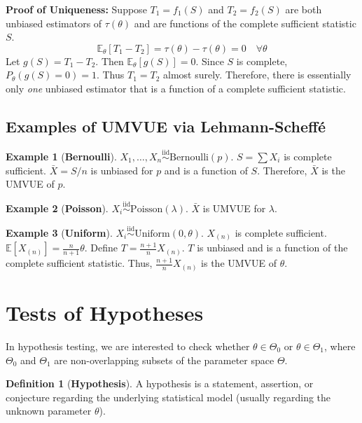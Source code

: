 \documentclass[12pt, a4paper]{article}
\theoremstyle{definition}
\newtheorem{definition}{Definition}
\newtheorem{example}{Example}
\newcommand{\E}{\mathbb{E}}
\newcommand{\iid}{\overset{\text{iid}}{\sim}}
\begin{document}
\textbf{Proof of Uniqueness:}
Suppose $T_1 = f_1(S)$ and $T_2 = f_2(S)$ are both unbiased estimators of $\tau(\theta)$ and are functions of the complete sufficient statistic $S$.
$$ \E_\theta[T_1 - T_2] = \tau(\theta) - \tau(\theta) = 0 \quad \forall \theta $$
Let $g(S) = T_1 - T_2$. Then $\E_\theta[g(S)] = 0$.
Since $S$ is complete, $P_\theta(g(S) = 0) = 1$.
Thus $T_1 = T_2$ almost surely.
Therefore, there is essentially only \textit{one} unbiased estimator that is a function of a complete sufficient statistic.

\subsection{Examples of UMVUE via Lehmann-Scheffé}

\begin{example}[\textbf{Bernoulli}]
$X_1, \dots, X_n \iid \text{Bernoulli}(p)$.
$S = \sum X_i$ is complete sufficient.
$\bar{X} = S/n$ is unbiased for $p$ and is a function of $S$.
Therefore, $\bar{X}$ is the UMVUE of $p$.
\end{example}

\begin{example}[\textbf{Poisson}]
$X_i \iid \text{Poisson}(\lambda)$. $\bar{X}$ is UMVUE for $\lambda$.
\end{example}

\begin{example}[\textbf{Uniform}]
$X_i \iid \text{Uniform}(0, \theta)$.
$X_{(n)}$ is complete sufficient.
$\E[X_{(n)}] = \frac{n}{n+1}\theta$.
Define $T = \frac{n+1}{n} X_{(n)}$.
$T$ is unbiased and is a function of the complete sufficient statistic.
Thus, $\frac{n+1}{n} X_{(n)}$ is the UMVUE of $\theta$.
\end{example}

\section{Tests of Hypotheses}

In hypothesis testing, we are interested to check whether $\theta \in \Theta_0$ or $\theta \in \Theta_1$, where $\Theta_0$ and $\Theta_1$ are non-overlapping subsets of the parameter space $\Theta$.

\begin{definition}[\textbf{Hypothesis}]
A hypothesis is a statement, assertion, or conjecture regarding the underlying statistical model (usually regarding the unknown parameter $\theta$).
\end{definition}
\end{document}
